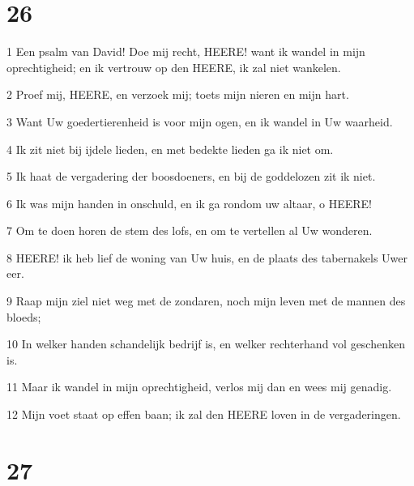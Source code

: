 \chapter{26}

\par 1 Een psalm van David! Doe mij recht, HEERE! want ik wandel in mijn oprechtigheid; en ik vertrouw op den HEERE, ik zal niet wankelen.
\par 2 Proef mij, HEERE, en verzoek mij; toets mijn nieren en mijn hart.
\par 3 Want Uw goedertierenheid is voor mijn ogen, en ik wandel in Uw waarheid.
\par 4 Ik zit niet bij ijdele lieden, en met bedekte lieden ga ik niet om.
\par 5 Ik haat de vergadering der boosdoeners, en bij de goddelozen zit ik niet.
\par 6 Ik was mijn handen in onschuld, en ik ga rondom uw altaar, o HEERE!
\par 7 Om te doen horen de stem des lofs, en om te vertellen al Uw wonderen.
\par 8 HEERE! ik heb lief de woning van Uw huis, en de plaats des tabernakels Uwer eer.
\par 9 Raap mijn ziel niet weg met de zondaren, noch mijn leven met de mannen des bloeds;
\par 10 In welker handen schandelijk bedrijf is, en welker rechterhand vol geschenken is.
\par 11 Maar ik wandel in mijn oprechtigheid, verlos mij dan en wees mij genadig.
\par 12 Mijn voet staat op effen baan; ik zal den HEERE loven in de vergaderingen.

\chapter{27}


